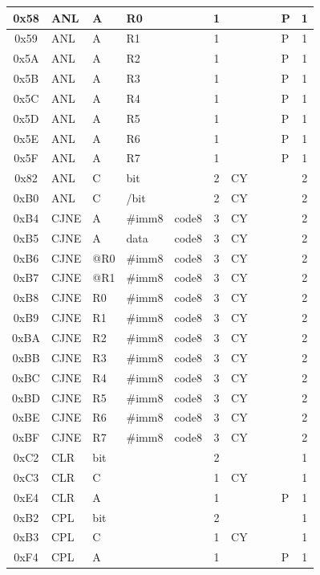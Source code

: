 \documentclass[a4paper,twoside,12pt]{book}
\begin{document}
{\begin{longtable}{|c|l|lll|c|llll|c|}
		0x58	& ANL	& A	& R0	&	& 1	&	&	&	& P	& 1	\\\hline
		0x59	& ANL	& A	& R1	&	& 1	&	&	&	& P	& 1	\\\hline
		0x5A	& ANL	& A	& R2	&	& 1	&	&	&	& P	& 1	\\\hline
		0x5B	& ANL	& A	& R3	&	& 1	&	&	&	& P	& 1	\\\hline
		0x5C	& ANL	& A	& R4	&	& 1	&	&	&	& P	& 1	\\\hline
		0x5D	& ANL	& A	& R5	&	& 1	&	&	&	& P	& 1	\\\hline
		0x5E	& ANL	& A	& R6	&	& 1	&	&	&	& P	& 1	\\\hline
		0x5F	& ANL	& A	& R7	&	& 1	&	&	&	& P	& 1	\\\hline
		0x82	& ANL	& C	& bit	&	& 2	& CY	&	&	&	& 2	\\\hline
		0xB0	& ANL	& C	& /bit	&	& 2	& CY	&	&	&	& 2	\\\hline
		0xB4	& CJNE	& A	& \#imm8& code8	& 3	& CY	&	&	&	& 2	\\\hline
		0xB5	& CJNE	& A	& data	& code8	& 3	& CY	&	&	&	& 2	\\\hline
		0xB6	& CJNE	& @R0	& \#imm8& code8	& 3	& CY	&	&	&	& 2	\\\hline
		0xB7	& CJNE	& @R1	& \#imm8& code8	& 3	& CY	&	&	&	& 2	\\\hline
		0xB8	& CJNE	& R0	& \#imm8& code8	& 3	& CY	&	&	&	& 2	\\\hline
		0xB9	& CJNE	& R1	& \#imm8& code8	& 3	& CY	&	&	&	& 2	\\\hline
		0xBA	& CJNE	& R2	& \#imm8& code8	& 3	& CY	&	&	&	& 2	\\\hline
		0xBB	& CJNE	& R3	& \#imm8& code8	& 3	& CY	&	&	&	& 2	\\\hline
		0xBC	& CJNE	& R4	& \#imm8& code8	& 3	& CY	&	&	&	& 2	\\\hline
		0xBD	& CJNE	& R5	& \#imm8& code8	& 3	& CY	&	&	&	& 2	\\\hline
		0xBE	& CJNE	& R6	& \#imm8& code8	& 3	& CY	&	&	&	& 2	\\\hline
		0xBF	& CJNE	& R7	& \#imm8& code8	& 3	& CY	&	&	&	& 2	\\\hline
		0xC2	& CLR	& bit	&	&	& 2	&	&	&	&	& 1	\\\hline
		0xC3	& CLR	& C	&	&	& 1	& CY	&	&	&	& 1	\\\hline
		0xE4	& CLR	& A	&	&	& 1	&	&	&	& P	& 1	\\\hline
		0xB2	& CPL	& bit	&	&	& 2	&	&	&	&	& 1	\\\hline
		0xB3	& CPL	& C	&	&	& 1	& CY	&	&	&	& 1	\\\hline
		0xF4	& CPL	& A	&	&	& 1	&	&	&	& P	& 1	\\\hline

\end{longtable}}
\end{document}
